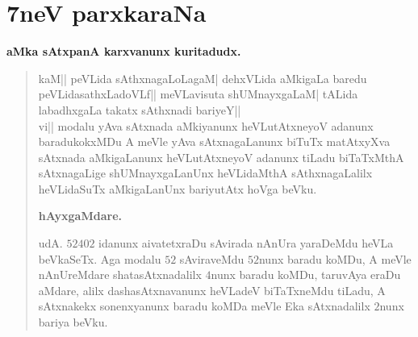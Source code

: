 
\chapter{7neV parxkaraNa}

\centerline{{\large\bf aMka sAtxpanA karxvanunx kuritadudx.}}
\smallskip

\begin{verse}
kaM|| peVLida sAthxnagaLoLagaM| dehxVLida aMkigaLa baredu peVLidasathxLadoVLf||
meVLavisuta shUMnayxgaLaM| tALida labadhxgaLa takatx sAthxnadi bariyeY||\\

vi|| modalu yAva sAtxnada aMkiyanunx heVLutAtxneyoV adanunx baradukokxMDu A meVle yAva sAtxnagaLanunx biTuTx matAtxyXva sAtxnada aMkigaLanunx heVLutAtxneyoV adanunx tiLadu biTaTxMthA sAtxnagaLige shUMnayxgaLanUnx heVLidaMthA sAthxnagaLalilx heVLidaSuTx aMkigaLanUnx bariyutAtx hoVga beVku.


\begin{center}
{\large\bf hAyxgaMdare.} 
\end{center}

udA. $52402$ idanunx aivatetxraDu sAvirada nAnUra yaraDeMdu heVLa beVkaSeTx. Aga modalu $52$ sAviraveMdu $52$nunx baradu koMDu, A meVle nAnUreMdare shatasAtxnadalilx $4$nunx baradu koMDu, taruvAya eraDu aMdare, alilx dashasAtxnavanunx heVLadeV biTaTxneMdu tiLadu, A sAtxnakekx sonenxyanunx baradu koMDa meVle Eka sAtxnadalilx $2$nunx bariya beVku.
\end{verse}

